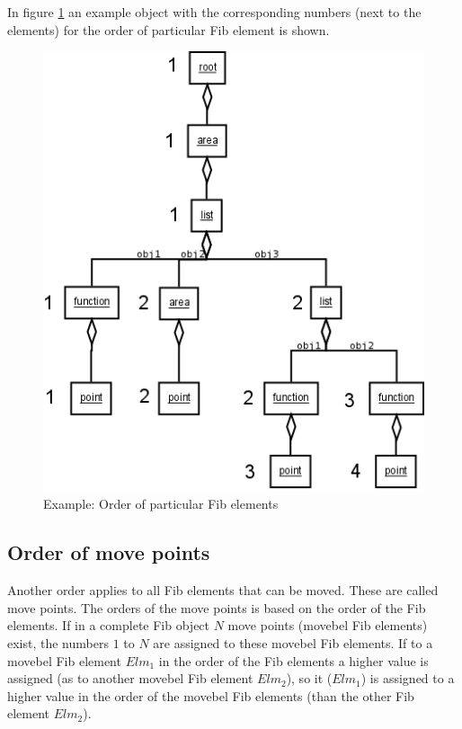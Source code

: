 In figure \ref{figOrderSpecialFibElements} an example object with the corresponding numbers (next to the elements) for the order of particular Fib element is shown.

\begin{figure}[htbp]
\begin{center}
  \includegraphics[scale=0.5]{order_special_elements}
\end{center}
\caption{Example: Order of particular Fib elements}
\label{figOrderSpecialFibElements}
\end{figure}


\subsection{Order of move points}

Another order applies to all Fib elements that can be moved. These are called move points.
The orders of the move points is based on the order of the Fib elements. If in a complete Fib object $N$ move points (movebel Fib elements) exist, the numbers $1$ to $N$ are assigned to these movebel Fib elements. If to a movebel Fib element $Elm_1$ in the order of the Fib elements a higher value is assigned (as to another movebel Fib element $Elm_2$), so it ($Elm_1$) is assigned to a higher value in the order of the movebel Fib elements (than the other Fib element $Elm_2$).

